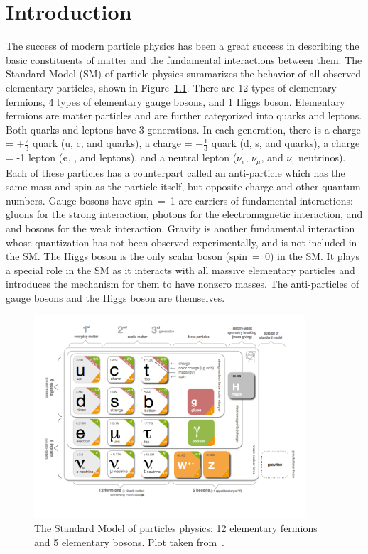 \chapter{Introduction}

The success of modern particle physics has been a great success in describing the basic constituents of matter and the fundamental interactions between them.
The Standard Model (SM) of particle physics summarizes the behavior of all observed elementary particles, shown in Figure~\ref{fig:SM_table}.
There are 12 types of elementary fermions, 4 types of elementary gauge bosons, and 1 Higgs boson.
Elementary fermions are matter particles and are further categorized into quarks and leptons.
Both quarks and leptons have 3 generations.
In each generation, there is a charge = $+\frac{2}{3}$ quark (u, c, and \Pqt quarks),
a charge = $-\frac{1}{3}$ quark (d, s, and \Pqb quarks), 
a charge = -1 lepton ($\mathrm{e}$, \mu, and \tau leptons),
and a neutral lepton ($\nu_{e}$, $\nu_{\mu}$, and $\nu_{\tau}$ neutrinos).
Each of these particles has a counterpart called an anti-particle which has the same mass and spin as the particle itself, 
but opposite charge and other quantum numbers.
Gauge bosons have spin~=~1 are carriers of fundamental interactions: 
gluons for the strong interaction, photons for the electromagnetic interaction,
and \PW and \PZ bosons for the weak interaction.
Gravity is another fundamental interaction whose quantization has not been observed experimentally,
and is not included in the SM.
The Higgs boson is the only scalar boson (spin~=~0) in the SM.
It plays a special role in the SM as it interacts with all massive elementary particles 
and introduces the mechanism for them to have nonzero masses.
The anti-particles of gauge bosons and the Higgs boson are themselves.

\begin{figure}[!htb]
    \centering
    \captionsetup{justification=justified}
    \includegraphics[width=0.9\textwidth]{pics/Intro/standard_model_cern.png}
    \caption{The Standard Model of particles physics: 12 elementary fermions and 5 elementary bosons.
             Plot taken from~\cite{SM_table_CERN}. }
    \label{fig:SM_table}
\end{figure}

